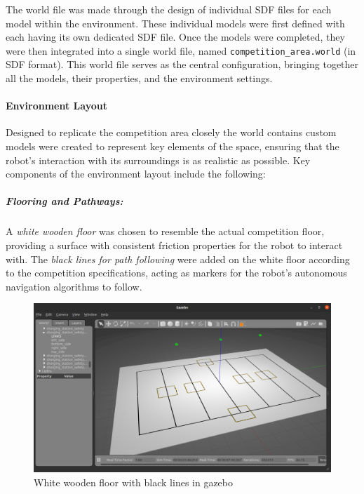 \documentclass[../../main]{subfiles}
\begin{document}
The world file was made through the design of 
individual SDF files for each model within the environment. These individual 
models were first defined with each having its own dedicated 
SDF file. Once the models were completed, they were then integrated into a 
single world file, named \texttt{competition\_area.world} (in SDF format). 
This world file serves as the central configuration, bringing together all 
the models, their properties, and the environment settings.
\paragraph{Environment Layout}  

Designed to replicate the competition area closely the world contains custom models were created to represent key elements of the space,
ensuring that the robot's interaction with its surroundings is as realistic as possible. Key components of the environment layout include the following:


    \subparagraph{Flooring and Pathways:}
    A \emph{white wooden floor} was chosen to resemble the actual competition floor, 
    providing a surface with consistent friction properties for the robot to interact with. The \emph{black lines for path 
    following} were added on the white floor according to the competition specifications, acting as markers for the robot's autonomous 
    navigation algorithms to follow.

    \begin{figure}[H]
        \centering
    \includegraphics[width=\textwidth]{fig/white_floor.png}
    \caption{White wooden floor with black lines in gazebo}
    \label{White wooden floor} %
    \end{figure}
\end{document}
